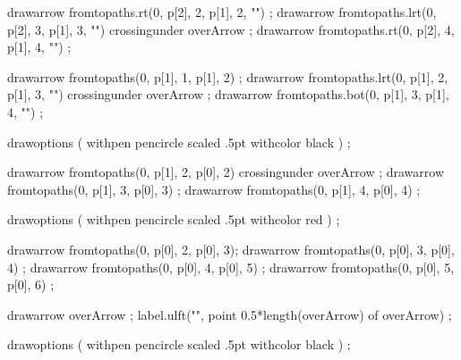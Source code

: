 drawarrow fromtopaths.rt(0, p[2], 2, p[1], 2, "") ;
drawarrow fromtopaths.lrt(0, p[2], 3, p[1], 3, "") crossingunder overArrow ;
drawarrow fromtopaths.rt(0, p[2], 4, p[1], 4, "") ;

drawarrow fromtopaths(0, p[1], 1, p[1], 2) ;
drawarrow fromtopaths.lrt(0, p[1], 2, p[1], 3, "") crossingunder overArrow ;
drawarrow fromtopaths.bot(0, p[1], 3, p[1], 4, "") ;

drawoptions (
  withpen pencircle scaled .5pt
  withcolor black
) ;

drawarrow fromtopaths(0, p[1], 2, p[0], 2) crossingunder overArrow ;
drawarrow fromtopaths(0, p[1], 3, p[0], 3) ;
drawarrow fromtopaths(0, p[1], 4, p[0], 4) ;


drawoptions (
  withpen pencircle scaled .5pt
  withcolor red
) ;

drawarrow fromtopaths(0, p[0], 2, p[0], 3);
drawarrow fromtopaths(0, p[0], 3, p[0], 4) ;
drawarrow fromtopaths(0, p[0], 4, p[0], 5) ;
drawarrow fromtopaths(0, p[0], 5, p[0], 6) ;


drawarrow overArrow ;
label.ulft("", point 0.5*length(overArrow) of overArrow) ;

drawoptions (
  withpen pencircle scaled .5pt
  withcolor black
) ;

\stopMPpage
